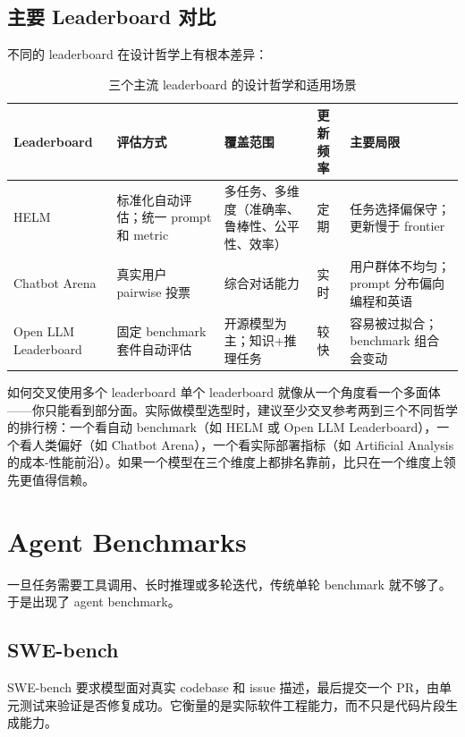 \documentclass[a4paper]{article}
\begin{document}
\subsection{主要 Leaderboard 对比}

不同的 leaderboard 在设计哲学上有根本差异：

\begin{table}[H]
\centering
\small
\begin{tabular}{p{2.5cm}p{2.8cm}p{2.8cm}p{2.5cm}p{2.5cm}}
\toprule
\textbf{Leaderboard} & \textbf{评估方式} & \textbf{覆盖范围} & \textbf{更新频率} & \textbf{主要局限} \\
\midrule
HELM & 标准化自动评估；统一 prompt 和 metric & 多任务、多维度（准确率、鲁棒性、公平性、效率） & 定期 & 任务选择偏保守；更新慢于 frontier \\
\midrule
Chatbot Arena & 真实用户 pairwise 投票 & 综合对话能力 & 实时 & 用户群体不均匀；prompt 分布偏向编程和英语 \\
\midrule
Open LLM Leaderboard & 固定 benchmark 套件自动评估 & 开源模型为主；知识+推理任务 & 较快 & 容易被过拟合；benchmark 组合会变动 \\
\bottomrule
\end{tabular}
\caption{三个主流 leaderboard 的设计哲学和适用场景}
\end{table}

\begin{knowledgebox}{如何交叉使用多个 leaderboard}
单个 leaderboard 就像从一个角度看一个多面体——你只能看到部分面。实际做模型选型时，建议至少交叉参考两到三个不同哲学的排行榜：一个看自动 benchmark（如 HELM 或 Open LLM Leaderboard），一个看人类偏好（如 Chatbot Arena），一个看实际部署指标（如 Artificial Analysis 的成本-性能前沿）。如果一个模型在三个维度上都排名靠前，比只在一个维度上领先更值得信赖。
\end{knowledgebox}

\section{Agent Benchmarks}

一旦任务需要工具调用、长时推理或多轮迭代，传统单轮 benchmark 就不够了。于是出现了 agent benchmark。

\subsection{SWE-bench}

SWE-bench 要求模型面对真实 codebase 和 issue 描述，最后提交一个 PR，由单元测试来验证是否修复成功。它衡量的是实际软件工程能力，而不只是代码片段生成能力。
\end{document}
